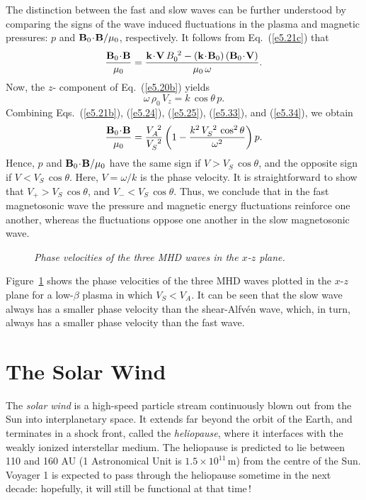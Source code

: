 The distinction between the fast and slow waves can be further understood
by comparing the signs of the wave induced fluctuations in the  plasma and magnetic
pressures: $p$ and ${\bf B}_0\!\cdot\! {\bf B}/\mu_0$, respectively. 
It follows from Eq.~(\ref{e5.21c}) that
\begin{equation}\label{e5.33}
\frac{{\bf B}_0\!\cdot\!{\bf B}}{\mu_0} = \frac{{\bf k}\!\cdot\!{\bf V}\,B_0^{~2}
- ({\bf k}\!\cdot\!{\bf B}_0)\,({\bf B}_0\!\cdot\!{\bf V})}
{\mu_0\,\omega}.
\end{equation}
Now, the $z$- component of Eq.~(\ref{e5.20b}) yields
\begin{equation}\label{e5.34}
\omega\,\rho_0\,V_z = k\,\cos\theta\,p.
\end{equation}
Combining Eqs.~(\ref{e5.21b}), (\ref{e5.24}), (\ref{e5.25}), (\ref{e5.33}), and (\ref{e5.34}), we obtain
\begin{equation}
\frac{{\bf B}_0\!\cdot\!{\bf B}}{\mu_0}
 =\frac{V_A^{~2}}{V_S^{~2}} \left(1-\frac{k^2\,V_S^{~2}\,\cos^2\theta}
{\omega^2}\right)p.
\end{equation}
Hence, $p$ and ${\bf B}_0\!\cdot\! {\bf B}/\mu_0$ have the same sign
if $V>V_S \,\cos\theta$, and the opposite sign if
$V<V_S\,\cos\theta$. Here, $V=\omega/k$ is the phase velocity. It is
straightforward to show that $V_+> V_S\,\cos\theta$, and $V_-<V_S\,\cos\theta$.
Thus, we conclude that in the fast magnetosonic wave the pressure and
magnetic energy fluctuations reinforce one another, whereas  the
fluctuations oppose one another in the slow magnetosonic wave.

\begin{figure}
\epsfysize=3in
\centerline{}
\caption{\em Phase velocities of the three MHD waves in the $x$-$z$ plane.}\label{f18}
\end{figure}

Figure~\ref{f18} shows the phase velocities of the three MHD waves plotted in the
$x$-$z$ plane for a low-$\beta$ plasma in which $V_S<V_A$. It can be
seen that the slow wave always has a smaller phase velocity than the
shear-Alfv\'{e}n wave, which, in turn, always has a smaller phase
velocity than the fast wave.

\section{The Solar Wind}
The {\em solar wind}\/ is a high-speed particle stream continuously blown out from
the Sun into interplanetary space. It extends  far beyond the orbit
of the Earth, and terminates in a shock front, called the {\em heliopause},
where it interfaces with the weakly ionized interstellar medium. The heliopause
is predicted to lie between 110 and
 160 AU (1 Astronomical Unit is $1.5\times 10^{11}$\,m)
from the centre of the Sun. Voyager 1 is expected to pass through the
heliopause sometime in the next decade: hopefully, it will still be
functional at that time\,!

